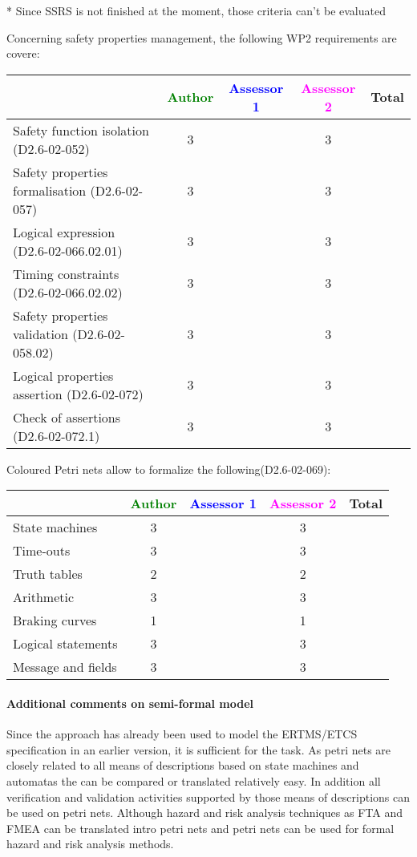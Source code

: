 \begin{assessor2}
* Since SSRS is not finished at the moment, those criteria can't be evaluated
\end{assessor2}

Concerning safety properties management, the following WP2 requirements are covere:

\begin{tabular}{|l | c | c | c | c|}
\hline
& \textcolor{green}{Author} & \textcolor{blue}{Assessor 1} & \textcolor{magenta}{Assessor 2} & Total \\
\hline 
Safety function isolation (D2.6-02-052)  & 3 & & 3 &  \\
\hline 
Safety properties formalisation (D2.6-02-057)  & 3 & & 3 &  \\
\hline
Logical expression (D2.6-02-066.02.01)  & 3 & & 3 &  \\
\hline
Timing constraints (D2.6-02-066.02.02)  & 3 & & 3 &  \\
\hline
Safety properties validation (D2.6-02-058.02)  & 3 & & 3 &  \\
\hline
Logical properties assertion (D2.6-02-072)  & 3 & & 3 &  \\
\hline
Check  of assertions (D2.6-02-072.1)  & 3 & & 3 &  \\
\hline
\end{tabular}

Coloured Petri nets allow to  formalize the following(D2.6-02-069):

\begin{tabular}{|l | c | c | c | c|}
\hline
& \textcolor{green}{Author} & \textcolor{blue}{Assessor 1} & \textcolor{magenta}{Assessor 2} & Total \\
\hline 
State machines  & 3 & & 3 &  \\
\hline
Time-outs  & 3 & & 3 &  \\
\hline
Truth tables  & 2 & & 2 &  \\
\hline
Arithmetic  & 3 & & 3 &  \\
\hline
Braking curves  & 1 & & 1 &  \\
\hline
Logical statements & 3 & & 3 &  \\
\hline
Message and fields & 3 & & 3 &  \\
\hline
\end{tabular}

\paragraph{Additional comments on semi-formal  model} 
Since the approach has already been used to model the ERTMS/ETCS specification in an earlier version, it is sufficient for the task.
As petri nets are closely related to all means of descriptions based on state machines and automatas the can be compared or translated relatively easy. In addition all verification and validation activities supported by those means of descriptions can be used on petri nets. Although hazard and risk analysis techniques as FTA and FMEA can be translated intro petri nets and petri nets can be used for formal hazard and risk analysis methods.


